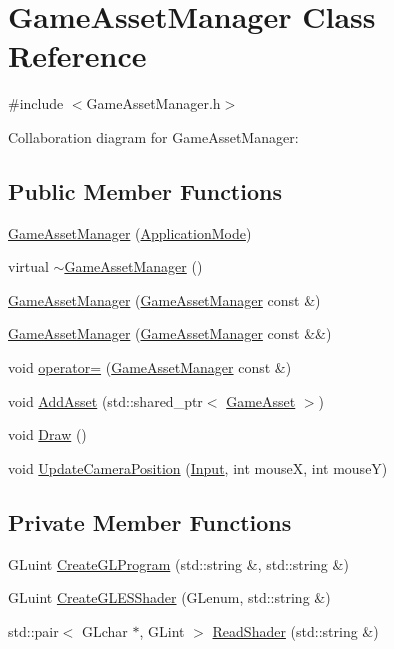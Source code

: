 \hypertarget{class_game_asset_manager}{}\section{Game\+Asset\+Manager Class Reference}
\label{class_game_asset_manager}


{\ttfamily \#include $<$Game\+Asset\+Manager.\+h$>$}



Collaboration diagram for Game\+Asset\+Manager\+:
\subsection*{Public Member Functions}
\begin{DoxyCompactItemize}
\item 
\hyperlink{class_game_asset_manager_aaa0d58e276cc10ad91a7457085598a71}{Game\+Asset\+Manager} (\hyperlink{common_8h_add86e7c88dd109abea3f708b422f31f0}{Application\+Mode})
\item 
virtual \hyperlink{class_game_asset_manager_a1270bd61ecbcca563f079803e40c9b77}{$\sim$\+Game\+Asset\+Manager} ()
\item 
\hyperlink{class_game_asset_manager_a2c9adcb72faa154c87eadc9bafe5269d}{Game\+Asset\+Manager} (\hyperlink{class_game_asset_manager}{Game\+Asset\+Manager} const \&)
\item 
\hyperlink{class_game_asset_manager_a44f6e2fd6b8ff1dd64e5697f1be7386d}{Game\+Asset\+Manager} (\hyperlink{class_game_asset_manager}{Game\+Asset\+Manager} const \&\&)
\item 
void \hyperlink{class_game_asset_manager_ac72678a4ad5378c685aa6bae84a4e712}{operator=} (\hyperlink{class_game_asset_manager}{Game\+Asset\+Manager} const \&)
\item 
void \hyperlink{class_game_asset_manager_ad3de8ff00d55ba04728b1de8213b2349}{Add\+Asset} (std\+::shared\+\_\+ptr$<$ \hyperlink{class_game_asset}{Game\+Asset} $>$)
\item 
void \hyperlink{class_game_asset_manager_a32837132bd70a9a9ed537323c2d3d886}{Draw} ()
\item 
void \hyperlink{class_game_asset_manager_a2a2eeb7778b2955694cf2dd68f9daefb}{Update\+Camera\+Position} (\hyperlink{common_8h_a080a822f0093973313bd644e517a5090}{Input}, int mouse\+X, int mouse\+Y)
\end{DoxyCompactItemize}
\subsection*{Private Member Functions}
\begin{DoxyCompactItemize}
\item 
G\+Luint \hyperlink{class_game_asset_manager_abec45b44a8b35ad2d7d817ba10e0dd8d}{Create\+G\+L\+Program} (std\+::string \&, std\+::string \&)
\item 
G\+Luint \hyperlink{class_game_asset_manager_a1a1e5c07f941e8d3fda40d9442ac7037}{Create\+G\+L\+E\+S\+Shader} (G\+Lenum, std\+::string \&)
\item 
std\+::pair$<$ G\+Lchar $\ast$, G\+Lint $>$ \hyperlink{class_game_asset_manager_a23b124a213308a68a882727127601c97}{Read\+Shader} (std\+::string \&)
\end{DoxyCompactItemize}
